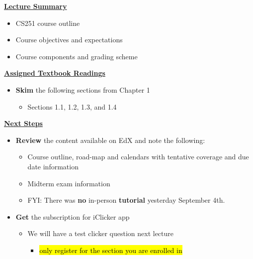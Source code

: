  \begin{frame}[fragile]
 \underline{\textbf{Lecture Summary}}
 \begin{itemize}
 \item CS251 course outline
 \item Course objectives and expectations
 \item Course components and grading scheme
 \end{itemize}
 \underline{\textbf{Assigned Textbook Readings}}
\begin{itemize}
     \item \textbf{Skim} the following sections from Chapter 1
    \begin{itemize}
	
     \item Sections 1.1, 1.2, 1.3, and 1.4
    \end{itemize}

\end{itemize}
    \underline{\textbf{Next Steps}}
    
    \begin{itemize}
    \item \textbf{Review} the content available on EdX and note the following:
\begin{itemize}
     \item Course outline, road-map and calendars with tentative coverage and due date information
     \item Midterm exam information 
     \item FYI: There was \textbf{no} in-person {\bf tutorial} yesterday September 4th. 
    \end{itemize}
\item \textbf{Get} the subscription for iClicker app
\begin{itemize}
    \item We will have a test clicker question next lecture
    \begin{itemize}
        \item \hl{only register for the section you are enrolled in}
    \end{itemize}
\end{itemize}
 \end{itemize}

 \end{frame}